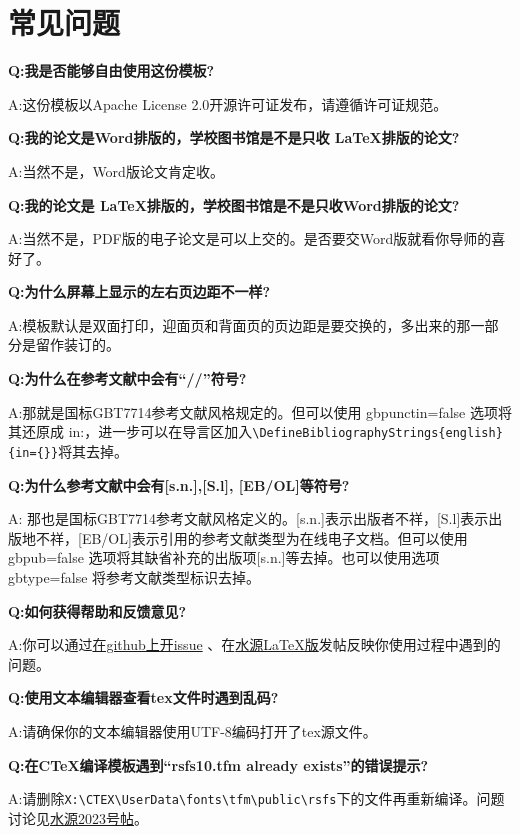 \chapter{常见问题}
\label{chap:faq}

{\bfseries{}Q:我是否能够自由使用这份模板?}

A:这份模板以Apache License 2.0开源许可证发布，请遵循许可证规范。

{\bfseries{}Q:我的论文是Word排版的，学校图书馆是不是只收 \LaTeX 排版的论文?}

A:当然不是，Word版论文肯定收。

{\bfseries{}Q:我的论文是 \LaTeX 排版的，学校图书馆是不是只收Word排版的论文?}

A:当然不是，PDF版的电子论文是可以上交的。是否要交Word版就看你导师的喜好了。

{\bfseries{}Q:为什么屏幕上显示的左右页边距不一样?}

A:模板默认是双面打印，迎面页和背面页的页边距是要交换的，多出来的那一部分是留作装订的。

{\bfseries{}Q:为什么在参考文献中会有“//”符号?}

A:那就是国标GBT7714参考文献风格规定的。但可以使用 gbpunctin=false 选项将其还原成 in:，进一步可以在导言区加入\verb+\DefineBibliographyStrings{english}{in={}}+将其去掉。

{\bfseries{}Q:为什么参考文献中会有[s.n.],[S.l], [EB/OL]等符号?}

A: 那也是国标GBT7714参考文献风格定义的。[s.n.]表示出版者不祥，[S.l]表示出版地不祥，[EB/OL]表示引用的参考文献类型为在线电子文档。但可以使用gbpub=false 选项将其缺省补充的出版项[s.n.]等去掉。也可以使用选项 gbtype=false 将参考文献类型标识去掉。

{\bfseries{}Q:如何获得帮助和反馈意见?}

A:你可以通过\href{https://github.com/sjtug/SJTUThesis/issues}{在github上开issue}
、在\href{https://bbs.sjtu.edu.cn/bbsdoc?board=TeX_LaTeX}{水源LaTeX版}发帖反映你使用过程中遇到的问题。

{\bfseries{}Q:使用文本编辑器查看tex文件时遇到乱码?}

A:请确保你的文本编辑器使用UTF-8编码打开了tex源文件。

{\bfseries{}Q:在CTeX编译模板遇到“rsfs10.tfm already exists”的错误提示?}

A:请删除\verb+X:\CTEX\UserData\fonts\tfm\public\rsfs+下的文件再重新编译。问题讨论见\href{https://bbs.sjtu.edu.cn/bbstcon,board,TeX_LaTeX,reid,1352982719.html}{水源2023号帖}。

